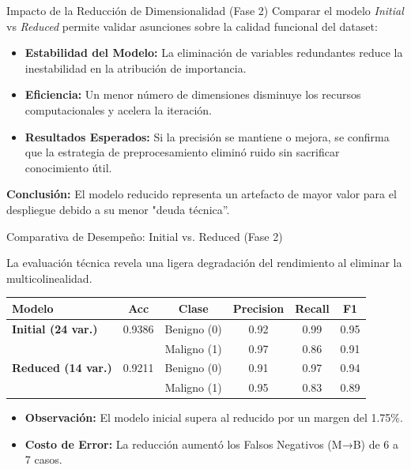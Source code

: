 \documentclass{beamer}
\begin{document}
	\begin{frame}{Impacto de la Reducción de Dimensionalidad (Fase 2)}
		Comparar el modelo \textit{Initial} vs \textit{Reduced} permite validar asunciones sobre la calidad funcional del dataset:
		
		\begin{itemize}
			\item<2-> \textbf{Estabilidad del Modelo:} La eliminación de variables redundantes reduce la inestabilidad en la atribución de importancia.
			\item<3-> \textbf{Eficiencia:} Un menor número de dimensiones disminuye los recursos computacionales y acelera la iteración.
			\item<4-> \textbf{Resultados Esperados:} Si la precisión se mantiene o mejora, se confirma que la estrategia de preprocesamiento eliminó ruido sin sacrificar conocimiento útil.
		\end{itemize}
		\textbf{Conclusión:} El modelo reducido representa un artefacto de mayor valor para el despliegue debido a su menor "deuda técnica''.
	\end{frame}
	
	\begin{frame}{Comparativa de Desempeño: Initial vs. Reduced (Fase 2)}
		\scriptsize
		
		La evaluación técnica revela una ligera degradación del rendimiento al eliminar la multicolinealidad.
		
		\begin{table}
			\tiny
			\centering
			\begin{tabular}{lccccc}
				\toprule
				\textbf{Modelo} & \textbf{Acc} & \textbf{Clase} & \textbf{Precision} & \textbf{Recall} & \textbf{F1} \\ 
				\midrule
				\textbf{Initial (24 var.)} & 0.9386 & Benigno (0) & 0.92 & 0.99 & 0.95 \\
				&  & Maligno (1) & 0.97 & 0.86 & 0.91 \\ 
				\midrule
				\textbf{Reduced (14 var.)} & 0.9211 & Benigno (0) & 0.91 & 0.97 & 0.94 \\
				&  & Maligno (1) & 0.95 & 0.83 & 0.89 \\ 
				\bottomrule
			\end{tabular}
		\end{table}
		
		\begin{itemize}
			\item<3-> \textbf{Observación:} El modelo inicial supera al reducido por un margen del 1.75\%.
			\item<4-> \textbf{Costo de Error:} La reducción aumentó los Falsos Negativos (M→B) de 6 a 7 casos.
		\end{itemize}
		
	\end{frame}
	
\end{document}
